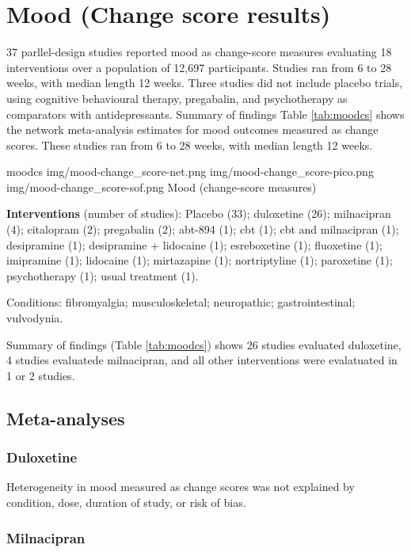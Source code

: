 \documentclass{report}\usepackage[]{graphicx}\usepackage[]{color}
\begin{document}
\section{Mood (Change score results)}

37 parllel-design studies reported mood as change-score measures evaluating 18 interventions over a population of 12,697 participants. Studies ran from 6 to 28 weeks, with median length 12 weeks. Three studies did not include placebo trials, using cognitive behavioural therapy, pregabalin, and psychotherapy as comparators with antidepressants. Summary of findings Table \ref{tab:moodcs} shows the network meta-analysis estimates for mood outcomes measured as change scores. These studies ran from 6 to 28 weeks, with median length 12 weeks.

\soffignew
{moodcs}
{img/mood-change_score-net.png}
{img/mood-change_score-pico.png}
{img/mood-change_score-sof.png}
{Mood (change-score measures)}


\textbf{Interventions} (number of studies): Placebo (33); duloxetine (26); milnacipran (4); citalopram (2); pregabalin (2); abt-894 (1); cbt (1); cbt and milnacipran (1); desipramine (1); desipramine + lidocaine (1); esreboxetine (1); fluoxetine (1); imipramine (1); lidocaine (1); mirtazapine (1); nortriptyline (1); paroxetine (1); psychotherapy (1); usual treatment (1).

Conditions: fibromyalgia; musculoskeletal; neuropathic; gastrointestinal; vulvodynia.

Summary of findings (Table \ref{tab:moodcs}) shows 26 studies evaluated duloxetine, 4 studies evaluatede milnacipran, and all other interventions were evalatuated in 1 or 2 studies.

\subsection{Meta-analyses}

\subsubsection{Duloxetine}

Heterogeneity in mood measured as change scores was not explained by condition, dose, duration of study, or risk of bias.

\subsubsection{Milnacipran}
\end{document}
